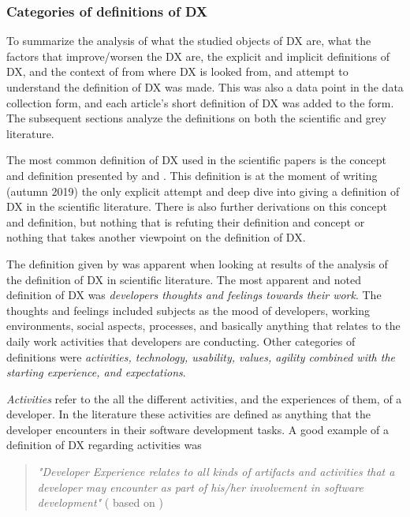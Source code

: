 \documentclass[english, 12pt, a4paper, sci, utf8, a-1b, online]{aaltothesis}
\newcommand{\now}{autumn 2019}
\newcounter{subsubsubsection}[subsubsection]
\begin{document}
\subsubsection{Categories of definitions of DX}

To summarize the analysis of what the studied objects of DX are, what the factors that improve/worsen the DX are, the explicit and implicit definitions of DX, and the context of from where DX is looked from, and attempt to understand the definition of DX was made. This was also a data point in the data collection form, and each article's short definition of DX was added to the form. The subsequent sections analyze the definitions on both the scientific and grey literature.


The most common definition of DX used in the scientific papers is the concept and definition presented by \textcite{fagerholm-dx-concept-and-definition} and \textcite{fagerholm-doctoral-thesis}. This definition is at the moment of writing (\now) the only explicit attempt and deep dive into giving a definition of DX in the scientific literature. There is also further derivations on this concept and definition, but nothing that is refuting their definition and concept or nothing that takes another viewpoint on the definition of DX.

The definition given by \textcite{fagerholm-dx-concept-and-definition} was apparent when looking at results of the analysis of the definition of DX in scientific literature. The most apparent and noted definition of DX was \textit{developers thoughts and feelings towards their work}. The thoughts and feelings included subjects as the mood of developers, working environments, social aspects, processes, and basically anything that relates to the daily work activities that developers are conducting. Other categories of definitions were \textit{activities, technology, usability, values, agility combined with the starting experience, and expectations}.

\textit{Activities} refer to the all the different activities, and the experiences of them, of a developer. In the literature these activities are defined as anything that the developer encounters in their software development tasks. A good example of a definition of DX regarding activities was

\begin{quotation}
  \noindent \textit{"Developer Experience relates to all kinds of artifacts and activities that a developer may encounter as part of his/her involvement in software development"} (\textcite{ekwoge2017tester} based on \textcite{fagerholm-dx-concept-and-definition})
\end{quotation}
\end{document}
